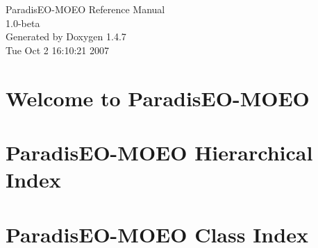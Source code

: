 \documentclass[a4paper]{book}
\begin{document}
\begin{titlepage}
\vspace*{7cm}
\begin{center}
{\Large Paradis\-EO-MOEO Reference Manual\\[1ex]\large 1.0-beta }\\
\vspace*{1cm}
{\large Generated by Doxygen 1.4.7}\\
\vspace*{0.5cm}
{\small Tue Oct 2 16:10:21 2007}\\
\end{center}
\end{titlepage}
\clearemptydoublepage
{}
\tableofcontents
\clearemptydoublepage
{}
\chapter{Welcome to Paradis\-EO-MOEO }
\label{index}
\chapter{Paradis\-EO-MOEO Hierarchical Index}

\chapter{Paradis\-EO-MOEO Class Index}

\end{document}

